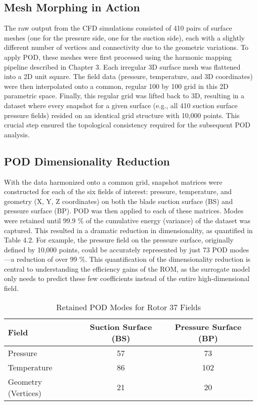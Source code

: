 \documentclass[dsc, EN]{ufabcFHZh}
\begin{document}
\subsection{Mesh Morphing in Action}

The raw output from the CFD simulations consisted of 410 pairs of surface meshes (one for the pressure side, one for the suction side), each with a slightly different number of vertices and connectivity due to the geometric variations. To apply POD, these meshes were first processed using the harmonic mapping pipeline described in Chapter 3. Each irregular 3D surface mesh was flattened into a 2D unit square. The field data (pressure, temperature, and 3D coordinates) were then interpolated onto a common, regular 100 by 100 grid in this 2D parametric space. Finally, this regular grid was lifted back to 3D, resulting in a dataset where every snapshot for a given surface (e.g., all 410 suction surface pressure fields) resided on an identical grid structure with 10,000 points. This crucial step ensured the topological consistency required for the subsequent POD analysis.  

\subsection{ POD Dimensionality Reduction}

With the data harmonized onto a common grid, snapshot matrices were constructed for each of the six fields of interest: pressure, temperature, and geometry (X, Y, Z coordinates) on both the blade suction surface (BS) and pressure surface (BP). POD was then applied to each of these matrices. Modes were retained until 99.9 \% of the cumulative energy (variance) of the dataset was captured. This resulted in a dramatic reduction in dimensionality, as quantified in Table 4.2. For example, the pressure field on the pressure surface, originally defined by 10,000 points, could be accurately represented by just 73 POD modes—a reduction of over 99 \%. This quantification of the dimensionality reduction is central to understanding the efficiency gains of the ROM, as the surrogate model only needs to predict these few coefficients instead of the entire high-dimensional field.

\begin{table}[htbp]
  \centering
  \caption{Retained POD Modes for Rotor 37 Fields}
  \label{tab:retained_pod_modes}
  \begin{tabular}{|l|c|c|}
    \hline
    \textbf{Field} & \textbf{Suction Surface (BS)} & \textbf{Pressure Surface (BP)} \\
    \hline
    Pressure & 57 & 73 \\
    Temperature & 86 & 102 \\
    Geometry (Vertices) & 21 & 20 \\
    \hline
  \end{tabular}
\end{table}
\end{document}
